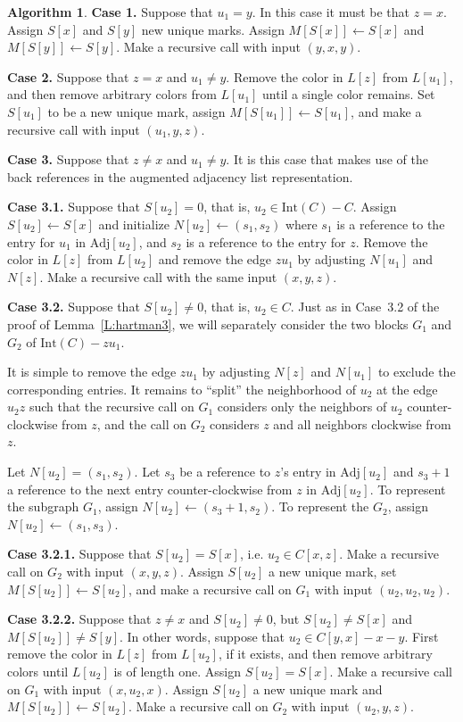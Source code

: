 \documentclass[12pt,letterpaper]{article}
\theoremstyle{plain}
\theoremstyle{definition}
\theoremstyle{break}
\newtheorem{algorithm}[lemma]{Algorithm}     %
\begin{document}
\begin{algorithm}
\textbf{Case 1.} Suppose that $u_1=y$. In this case it must be that
$z=x$. Assign
$S[x]$ and $S[y]$ new unique marks. Assign $M[S[x]]\leftarrow S[x]$
and $M[S[y]]\leftarrow S[y]$. Make a recursive call with
input $(y, x, y)$.

\textbf{Case 2.} Suppose that $z=x$ and $u_1\ne y$. 
Remove the color in $L[z]$ from $L[u_1]$, and then remove arbitrary
colors from $L[u_1]$ until a single color remains.
Set $S[u_1]$ to be a new unique mark, assign $M[S[u_1]]\leftarrow S[u_1]$,
and make a recursive call with input $(u_1, y, z)$.

\textbf{Case 3.} Suppose that $z\ne x$ and $u_1\ne y$. It is this case that
makes use of the back references in the augmented adjacency list representation.

\textbf{Case 3.1.} Suppose that $S[u_2]=0$, that is, $u_2\in
\text{Int}(C)-C$. Assign $S[u_2]\leftarrow S[x]$ and initialize
$N[u_2]\leftarrow(s_1,s_2)$ where $s_1$ is a reference to the entry
for $u_1$ in $\text{Adj}[u_2]$, and $s_2$ is a reference to the entry
for $z$. Remove the color in $L[z]$ from
$L[u_2]$ and remove the edge $zu_1$ by adjusting
$N[u_1]$ and $N[z]$. Make a recursive call with the same input $(x, y, z)$.

\textbf{Case 3.2.} Suppose that $S[u_2]\ne 0$, that is, $u_2\in C$. Just as in
Case~3.2 of the proof of Lemma~\ref{L:hartman3}, we will separately consider
the two blocks $G_1$ and $G_2$ of $\text{Int}(C)-zu_1$.

It is simple to remove the edge $zu_1$ by adjusting $N[z]$ and $N[u_1]$ to
exclude
the corresponding entries. It remains
to ``split'' the
neighborhood of $u_2$ at the edge $u_2z$ such that the recursive call on $G_1$
considers only the neighbors of $u_2$ counter-clockwise from $z$, and the call
on $G_2$ considers $z$ and all neighbors clockwise from $z$.

Let $N[u_2]=(s_1,s_2)$. Let $s_3$ be a reference to $z$'s entry in
$\text{Adj}[u_2]$ and
$s_3+1$ a reference to the next entry counter-clockwise from $z$ in
$\text{Adj}[u_2]$.
To represent
the subgraph $G_1$, assign
$N[u_2]\leftarrow (s_3+1,s_2)$. To represent the $G_2$,
assign $N[u_2]\leftarrow (s_1,s_3)$.

\textbf{Case 3.2.1.} Suppose that $S[u_2]=S[x]$, i.e. $u_2\in C[x,z]$. Make a
recursive call on $G_2$ with input $(x, y, z)$. Assign
$S[u_2]$ a new
unique mark, set $M[S[u_2]]\leftarrow S[u_2]$, and make a recursive call
on $G_1$ with input $(u_2, u_2, u_2)$.

\textbf{Case 3.2.2.} Suppose that $z\ne x$ and $S[u_2]\ne 0$, but
$S[u_2]\ne S[x]$ and $M[S[u_2]]\ne S[y]$. In other words, suppose that
$u_2\in C[y,x]-x-y$.
First remove the color in $L[z]$ from $L[u_2]$, if it exists, and then remove
arbitrary colors until $L[u_2]$ is of length one. Assign $S[u_2]=S[x]$.
Make a recursive call on $G_1$ with input $(x, u_2, x)$.
Assign $S[u_2]$ a new unique mark and $M[S[u_2]]\leftarrow S[u_2]$.
Make a recursive call on $G_2$ with input $(u_2, y, z)$.


\end{algorithm}
\end{document}
